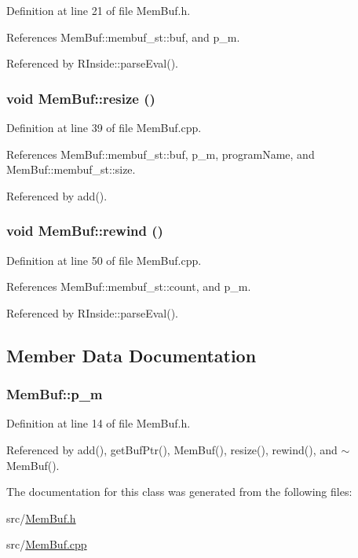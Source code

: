 Definition at line 21 of file MemBuf.h.

References MemBuf::membuf\_\-st::buf, and p\_\-m.

Referenced by RInside::parseEval().\hypertarget{classMemBuf_a4cb3b44d88059c382184ca7d1aa1f235}{
\subsubsection[{resize}]{\setlength{\rightskip}{0pt plus 5cm}void MemBuf::resize ()}}
\label{classMemBuf_a4cb3b44d88059c382184ca7d1aa1f235}


Definition at line 39 of file MemBuf.cpp.

References MemBuf::membuf\_\-st::buf, p\_\-m, programName, and MemBuf::membuf\_\-st::size.

Referenced by add().\hypertarget{classMemBuf_acecce3962e522cdcabba571ffd51f940}{
\subsubsection[{rewind}]{\setlength{\rightskip}{0pt plus 5cm}void MemBuf::rewind ()}}
\label{classMemBuf_acecce3962e522cdcabba571ffd51f940}


Definition at line 50 of file MemBuf.cpp.

References MemBuf::membuf\_\-st::count, and p\_\-m.

Referenced by RInside::parseEval().

\subsection{Member Data Documentation}
\hypertarget{classMemBuf_a2082ceb5554215dd792a83b2679a805a}{
\subsubsection[{p\_\-m}]{ {\bf MemBuf::p\_\-m}}}
\label{classMemBuf_a2082ceb5554215dd792a83b2679a805a}


Definition at line 14 of file MemBuf.h.

Referenced by add(), getBufPtr(), MemBuf(), resize(), rewind(), and $\sim$MemBuf().

The documentation for this class was generated from the following files:\begin{DoxyCompactItemize}
\item 
src/\hyperlink{MemBuf_8h}{MemBuf.h}\item 
src/\hyperlink{MemBuf_8cpp}{MemBuf.cpp}\end{DoxyCompactItemize}
